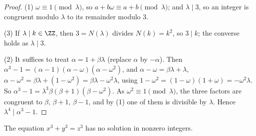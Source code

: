 \begin{proof}
(1) $\omega \equiv 1 \pmod \lambda$, so $a + b\omega \equiv a + b \pmod \lambda$; and $\lambda \mid 3$, so an integer is congruent modulo $\lambda$ to its remainder modulo $3$.

(3) If $\lambda \mid k \in \ZZ$, then $3 = N(\lambda)$ divides $N(k) = k^2$, so $3 \mid k$; the converse holds as $\lambda \mid 3$.

(2) It suffices to treat $\alpha = 1 + \beta\lambda$ (replace $\alpha$ by $-\alpha$). Then
$\alpha^3 - 1 = (\alpha - 1)(\alpha - \omega)(\alpha - \omega^2)$, and $\alpha - \omega = \beta\lambda + \lambda$, $\alpha - \omega^2 = \beta\lambda + (1 - \omega^2) = \beta\lambda - \omega^2\lambda$, using
$1 - \omega^2 = (1 - \omega)(1 + \omega) = -\omega^2\lambda$. So $\alpha^3 - 1 = \lambda^3\beta(\beta + 1)(\beta - \omega^2)$. As $\omega^2 \equiv 1 \pmod \lambda$, the three factors are congruent to
$\beta$, $\beta + 1$, $\beta - 1$, and by (1) one of them is divisible by $\lambda$. Hence $\lambda^4 \mid \alpha^3 - 1$.
\end{proof}

\begin{theorem}\label{diophantine-equations:theorem-flt-three}
The equation $x^3 + y^3 = z^3$ has no solution in nonzero integers.
\end{theorem}

